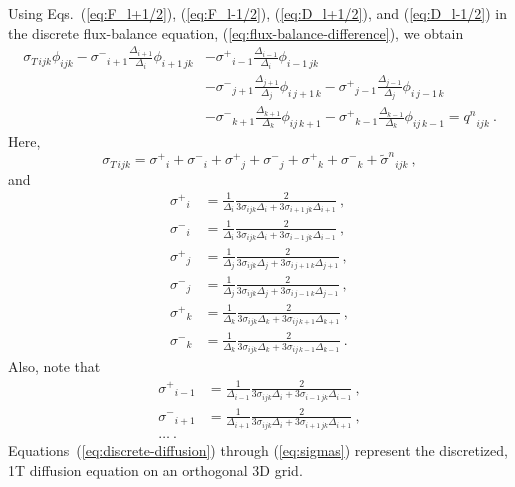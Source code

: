 \documentclass[preprint,12pt]{elsarticle}
\newcommand{\sign}{\ensuremath{\tilde{\sigma}^n}}
\newcommand{\qn}{\ensuremath{q^n}} \newcommand{\Tn}{\ensuremath{T^n}}
\newcommand{\Di}{\ensuremath{\Delta_i}}
\newcommand{\Dj}{\ensuremath{\Delta_j}}
\newcommand{\Dk}{\ensuremath{\Delta_k}}
\newcommand{\sigT}{\ensuremath{\sigma_{T\,ijk}}}
\newcommand{\sigm}{\ensuremath{\sigma^{-}}}
\newcommand{\sigp}{\ensuremath{\sigma^{+}}}
\begin{document}
Using Eqs.~(\ref{eq:F_l+1/2}), (\ref{eq:F_l-1/2}), (\ref{eq:D_l+1/2}),
and (\ref{eq:D_l-1/2}) in the discrete flux-balance equation,
(\ref{eq:flux-balance-difference}), we obtain
\begin{equation}
  \begin{aligned}
    \sigT\phi_{ijk} -
    \sigm_{i+1}\frac{\Delta_{i+1}}{\Di}\phi_{i+1\,jk} & -
    \sigp_{i-1}\frac{\Delta_{i-1}}{\Di}\phi_{i-1\,jk}\\ &-
    \sigm_{j+1}\frac{\Delta_{j+1}}{\Dj}\phi_{i\,j+1\,k} -
    \sigp_{j-1}\frac{\Delta_{j-1}}{\Dj}\phi_{i\,j-1\,k}\\ &-
    \sigm_{k+1}\frac{\Delta_{k+1}}{\Dk}\phi_{ij\,k+1} -
    \sigp_{k-1}\frac{\Delta_{k-1}}{\Dk}\phi_{ij\,k-1} = \qn_{ijk}\:.
  \end{aligned}
  \label{eq:discrete-diffusion}
\end{equation}
Here,
\begin{equation}
  \sigT = \sigp_i + \sigm_i + \sigp_j + \sigm_j + \sigp_k + \sigm_k +
  \sign_{ijk}\:,
\end{equation}
and
\begin{subequations}
  \begin{align}
    \sigp_{i} &= \frac{1}{\Di}\frac{2}{3\sigma_{ijk}\Di +
      3\sigma_{i+1\,jk}\Delta_{i+1}}\:,\\ \sigm_{i} &=
    \frac{1}{\Di}\frac{2}{3\sigma_{ijk}\Di +
      3\sigma_{i-1\,jk}\Delta_{i-1}}\:,\\ \sigp_{j} &=
    \frac{1}{\Dj}\frac{2}{3\sigma_{ijk}\Dj +
      3\sigma_{i\,j+1\,k}\Delta_{j+1}}\:,\\ \sigm_{j} &=
    \frac{1}{\Dj}\frac{2}{3\sigma_{ijk}\Dj +
      3\sigma_{i\,j-1\,k}\Delta_{j-1}}\:,\\ \sigp_{k} &=
    \frac{1}{\Dk}\frac{2}{3\sigma_{ijk}\Dk +
      3\sigma_{ij\,k+1}\Delta_{k+1}}\:,\\ \sigm_{k} &=
    \frac{1}{\Dk}\frac{2}{3\sigma_{ijk}\Dk +
      3\sigma_{ij\,k-1}\Delta_{k-1}}\:.
  \end{align}
  \label{eq:sigmas}
\end{subequations}
Also, note that
\begin{align*}
  \sigp_{i-1} &= \frac{1}{\Delta_{i-1}}\frac{2}{3\sigma_{ijk}\Di +
    3\sigma_{i-1\,jk}\Delta_{i-1}}\:,\\ \sigm_{i+1} &=
  \frac{1}{\Delta_{i+1}}\frac{2}{3\sigma_{ijk}\Di +
    3\sigma_{i+1\,jk}\Delta_{i+1}}\:,\\ \ldots\:.
\end{align*}
Equations~(\ref{eq:discrete-diffusion}) through (\ref{eq:sigmas}) represent
the discretized, 1T diffusion equation on an orthogonal 3D grid.
\end{document}
